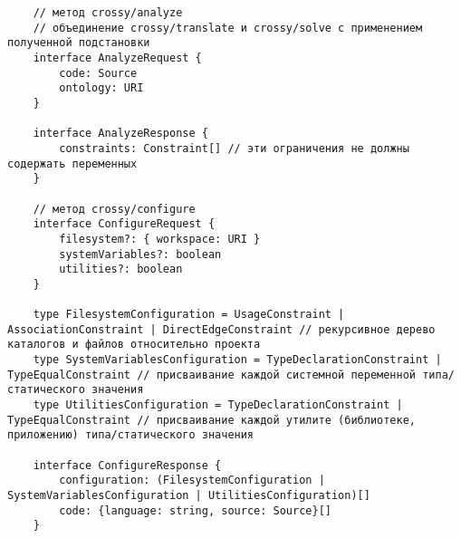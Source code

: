 \begin{verbatim}
    // метод crossy/analyze
    // объединение crossy/translate и crossy/solve с применением полученной подстановки
    interface AnalyzeRequest {
        code: Source
        ontology: URI
    }

    interface AnalyzeResponse {
        constraints: Constraint[] // эти ограничения не должны содержать переменных
    }

    // метод crossy/configure
    interface ConfigureRequest {
        filesystem?: { workspace: URI }
        systemVariables?: boolean
        utilities?: boolean
    }

    type FilesystemConfiguration = UsageConstraint | AssociationConstraint | DirectEdgeConstraint // рекурсивное дерево каталогов и файлов относительно проекта
    type SystemVariablesConfiguration = TypeDeclarationConstraint | TypeEqualConstraint // присваивание каждой системной переменной типа/статического значения
    type UtilitiesConfiguration = TypeDeclarationConstraint | TypeEqualConstraint // присваивание каждой утилите (библиотеке, приложению) типа/статического значения

    interface ConfigureResponse {
        configuration: (FilesystemConfiguration | SystemVariablesConfiguration | UtilitiesConfiguration)[]
        code: {language: string, source: Source}[]
    }
\end{verbatim}

